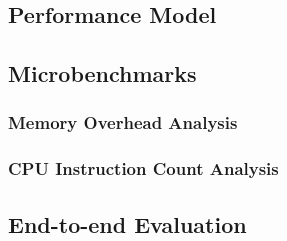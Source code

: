 \documentclass[../../main.tex]{subfiles}
\begin{document}
\subsection{Performance Model}

\subsection{Microbenchmarks}
\subsubsection{Memory Overhead Analysis}

\subsubsection{CPU Instruction Count Analysis}

\subsection{End-to-end Evaluation}

\end{document}
